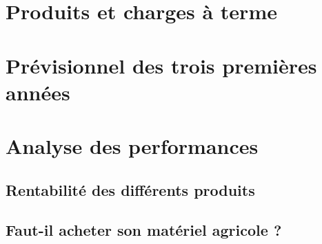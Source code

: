 \documentclass{book}
\begin{document}
\section{Produits et charges à terme}

\section{Prévisionnel des trois premières années}

\section{Analyse des performances}

\subsection{Rentabilité des différents produits}

\subsection{Faut-il acheter son matériel agricole ?}
\end{document}
